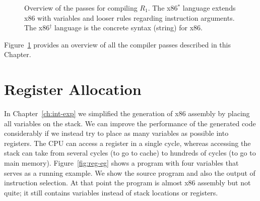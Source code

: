 \documentclass[11pt]{book}
\begin{document}
\begin{figure}[p]

\caption{Overview of the passes for compiling $R_1$.  The x86$^{*}$
  language extends x86 with variables and looser rules regarding
  instruction arguments. The x86$^{\dagger}$ language is the concrete
  syntax (string) for x86.}
\label{fig:R1-passes}
\end{figure}


Figure~\ref{fig:R1-passes} provides an overview of all the compiler
passes described in this Chapter.



\chapter{Register Allocation}
\label{ch:register-allocation}

In Chapter~\ref{ch:int-exp} we simplified the generation of x86
assembly by placing all variables on the stack. We can improve the
performance of the generated code considerably if we instead try to
place as many variables as possible into registers.  The CPU can
access a register in a single cycle, whereas accessing the stack can
take from several cycles (to go to cache) to hundreds of cycles (to go
to main memory).  Figure~\ref{fig:reg-eg} shows a program with four
variables that serves as a running example. We show the source program
and also the output of instruction selection. At that point the
program is almost x86 assembly but not quite; it still contains
variables instead of stack locations or registers.
\end{document}
